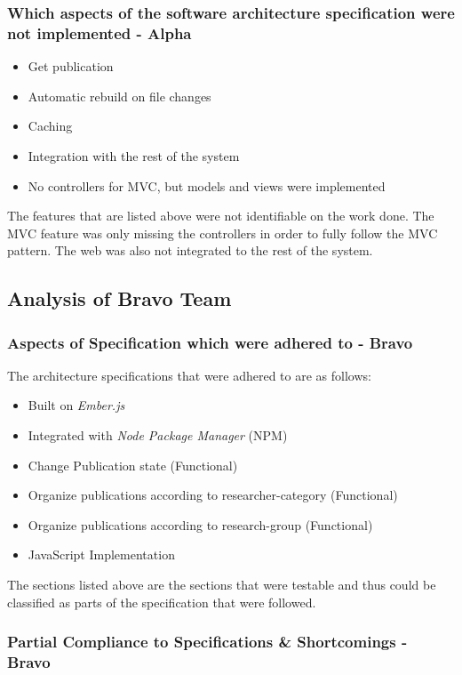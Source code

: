 \documentclass[english]{article}
\begin{document}
\subsubsection{Which aspects of the software architecture specification were not implemented - Alpha}	
\begin{itemize}
	\item Get publication
	\item Automatic rebuild on file changes
	\item Caching
	\item Integration with the rest of the system
	\item No controllers for MVC, but models and views were implemented
\end{itemize}
The features that are listed above were not identifiable on the work done. The MVC feature was only missing the controllers in order to fully follow the MVC pattern. The web was also not integrated to the rest of the system.

\subsection{Analysis of Bravo Team}

\subsubsection{Aspects of Specification which were adhered to - Bravo}
	The architecture specifications that were adhered to are as follows:
	\begin{itemize}
		\item Built on \textit{Ember.js}
		\item Integrated with \textit{Node Package Manager} (NPM)
		\item Change Publication state (Functional)
		\item Organize publications according to researcher-category (Functional)
		\item Organize publications according to research-group (Functional)
		\item JavaScript Implementation
	\end{itemize}
	
	
The sections listed above are the sections that were testable and thus could be classified as parts of the specification that were followed.

\subsubsection{Partial Compliance to Specifications \& Shortcomings - Bravo}
\end{document}
